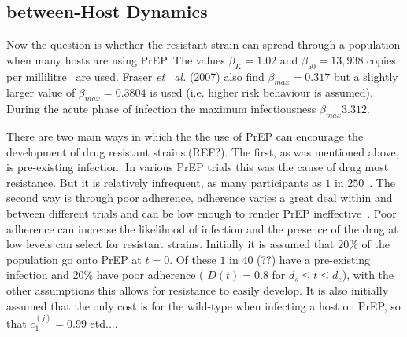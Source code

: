 \documentclass[DIV=15]{scrartcl}
\begin{document}
  

  
  
\subsection{between-Host Dynamics}  
 

Now the question is whether the resistant strain can spread through a population when many hosts are using PrEP.   The values $\beta_K = 1.02$ and $\beta_{50} = 13,938$ copies per millilitre~\cite{fraser2007}  are used. Fraser \textit{et \ al.} (2007)  also find $\beta_{max} = 0.317$ but a slightly larger value of  $\beta_{max}= 0.3804$ is used (i.e. higher risk behaviour is assumed).    
During the acute phase of infection the maximum infectiousness $\beta_{max} 3.312$.



There are two  main ways in which the
the use  of PrEP can encourage the development of drug resistant strains.(REF?). The first, as  was mentioned above, is pre-existing infection. In various PrEP trials this was the cause of  drug  most resistance. But it is relatively infrequent, 
as many participants as  $1$ in $250$~\cite{iprex2011}. The second way is through poor adherence, adherence varies a great deal within and between different trials and can be low enough to render PrEP ineffective~\cite{corneli2014}. Poor adherence can increase  the  likelihood
of infection and the presence of the drug at low levels can select for resistant strains. %
Initially it is  assumed that  
$20\%$ of the population  go  onto PrEP at $t=0$. Of these $1$ in $40$ (??) have a pre-existing infection  and $20\%$ have poor adherence ( $D(t) = 0.8$ for $ d_s \leq t \leq d_e$), with the other assumptions this allows for resistance to easily develop. It is also initially assumed that the only cost is for the wild-type when infecting a host on PrEP, so that $c_1^{(j)} = 0.99$  etd....

\end{document}

